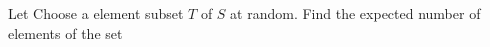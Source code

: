 Let   Choose a element subset $T$ of $S$ at random.  Find the expected number of elements of the set 